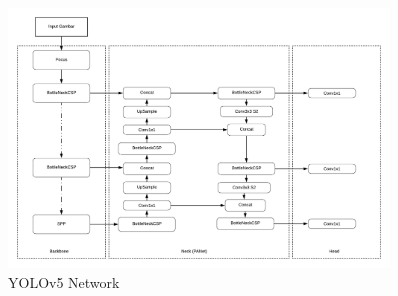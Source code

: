 \begin{figure} [ht]
  \centering
  \includegraphics[width=0.9\textwidth]{gambar/yolov5 structure.png}

  \caption{YOLOv5 Network}
  \label{fig:yolov5network}
\end{figure}